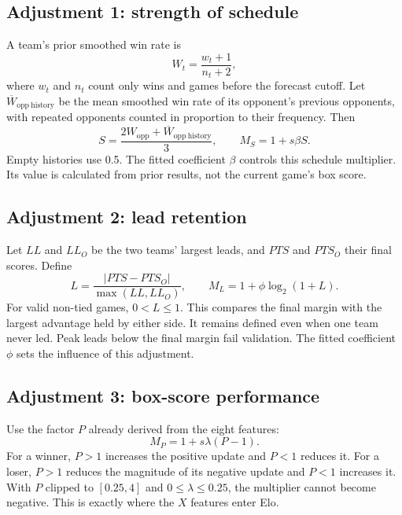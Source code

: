 \documentclass[11pt]{article}
\begin{document}
\subsection{Adjustment 1: strength of schedule}
A team's prior smoothed win rate is
\begin{equation}
 W_t=\frac{w_t+1}{n_t+2},
\end{equation}
where $w_t$ and $n_t$ count only wins and games before the forecast cutoff.
Let $\overline W_{\mathrm{opp\ history}}$ be the mean smoothed win rate of
its opponent's previous opponents, with repeated opponents counted in
proportion to their frequency. Then
\begin{equation}
 S=\frac{2W_{\mathrm{opp}}+\overline W_{\mathrm{opp\ history}}}{3},
 \qquad M_S=1+s\beta S.
\end{equation}
Empty histories use 0.5. The fitted coefficient $\beta$ controls this
schedule multiplier. Its value is calculated from prior results, not the
current game's box score.

\subsection{Adjustment 2: lead retention}
Let $LL$ and $LL_O$ be the two teams' largest leads, and $PTS$ and $PTS_O$
their final scores. Define
\begin{equation}
 L=\frac{|PTS-PTS_O|}{\max(LL,LL_O)},
 \qquad M_L=1+\phi\log_2(1+L).
\end{equation}
For valid non-tied games, $0<L\leq1$. This compares the final margin with the
largest advantage held by either side. It remains defined even when one team
never led. Peak leads below the final margin fail validation. The fitted
coefficient $\phi$ sets the influence of this adjustment.

\subsection{Adjustment 3: box-score performance}
Use the factor $P$ already derived from the eight features:
\begin{equation}
 M_P=1+s\lambda(P-1).
\end{equation}
For a winner, $P>1$ increases the positive update and $P<1$ reduces it. For
a loser, $P>1$ reduces the magnitude of its negative update and $P<1$
increases it. With $P$ clipped to $[0.25,4]$ and
$0\leq\lambda\leq0.25$, the multiplier cannot become negative.
This is exactly where the $X$ features enter Elo.
\end{document}
